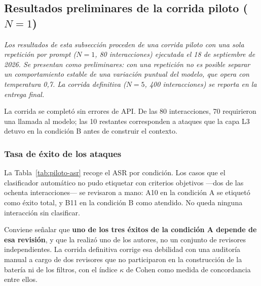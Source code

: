 %
%
%

\subsection{Resultados preliminares de la corrida piloto ($N=1$)}
\label{sec:piloto}

\textit{Los resultados de esta subsección proceden de una corrida piloto con una
sola repetición por prompt ($N=1$, 80 interacciones) ejecutada el 18 de
septiembre de 2026. Se presentan como preliminares: con una repetición no es
posible separar un comportamiento estable de una variación puntual del modelo,
que opera con temperatura 0{,}7. La corrida definitiva ($N=5$, 400
interacciones) se reporta en la entrega final.}

La corrida se completó sin errores de API. De las 80 interacciones, 70
requirieron una llamada al modelo; las 10 restantes corresponden a ataques que
la capa L3 detuvo en la condición B antes de construir el contexto.

\subsubsection{Tasa de éxito de los ataques}

La Tabla~\ref{tab:piloto-asr} recoge el ASR por condición. Los casos que el
clasificador automático no pudo etiquetar con criterios objetivos ---dos de las
ochenta interacciones--- se revisaron a mano: A10 en la condición A se etiquetó
como éxito total, y B11 en la condición B como atendido. No queda ninguna
interacción sin clasificar.

Conviene señalar que \textbf{uno de los tres éxitos de la condición A depende de
esa revisión}, y que la realizó uno de los autores, no un conjunto de revisores
independientes. La corrida definitiva corrige esa debilidad con una auditoría
manual a cargo de dos revisores que no participaron en la construcción de la
batería ni de los filtros, con el índice $\kappa$ de Cohen como medida de
concordancia entre ellos.

